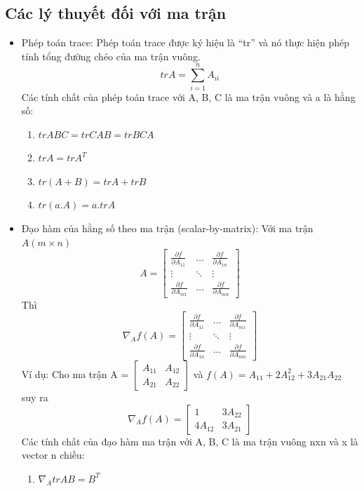 \subsection{Các lý thuyết đối với ma trận}
\begin{itemize}
  \item Phép toán trace: Phép toán trace được ký hiệu là “tr” và nó thực hiện
  phép tính tổng đường chéo của ma trận vuông.
  \[ trA = \sum_{i=1}^{n} A_{ii} \]
  Các tính chất của phép toán trace với A, B, C là ma trận vuông và a là
  hằng số:
  \begin{enumerate}
    \item $trABC = trCAB = trBCA$
    \item $trA = trA^T$
    \item $tr(A+B) = trA + trB$
    \item $tr(a.A) = a.trA$
  \end{enumerate}
  \item Đạo hàm của hằng số theo ma trận (scalar-by-matrix):
  Với ma trận $A (m \times n)$
  \[  A =
  \begin{bmatrix}
  \frac{\partial f}{\partial A_{11}} & \dots & \frac{\partial f}{\partial
  A_{1n}}\\
  \vdots & \ddots & \vdots \\
  \frac{\partial f}{\partial A_{m1}} & \dots & \frac{\partial f}{\partial
  A_{mn}}  
   \end{bmatrix} \]
   Thì 
   \[ \nabla_A f(A) = 
   \begin{bmatrix}
  \frac{\partial f}{\partial A_{11}} & \dots & \frac{\partial f}{\partial
  A_{m1}}\\
  \vdots & \ddots & \vdots \\
  \frac{\partial f}{\partial A_{1n}} & \dots & \frac{\partial f}{\partial
  A_{mn}}  
   \end{bmatrix}  \]
  Ví dụ: Cho ma trận A = $ \begin{bmatrix} A_{11} & A_{12} \\ A_{21} & A_{22}
  \end{bmatrix} $ và $f(A) = A_{11} + 2A_{12}^{2} + 3A_{21}A_{22}$ suy ra
  \[ \nabla_A f(A) = \begin{bmatrix} 1 & 3A_{22} \\ 4A_{12} & 3A_{21}
  \end{bmatrix} \]
  Các tính chất của đạo hàm ma trận với A, B, C là ma trận vuông nxn và x là
  vector n chiều:
  \begin{enumerate}
    \item $\nabla_A trAB = B^T$

\end{enumerate}
\end{itemize}
